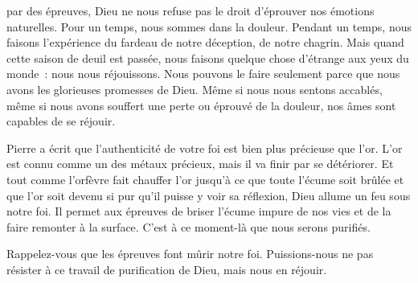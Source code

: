 
 par des épreuves, Dieu ne nous refuse pas
 le droit d'éprouver nos émotions naturelles. Pour un temps, nous sommes
 dans la douleur. Pendant un temps, nous faisons l'expérience du fardeau
 de notre déception, de notre chagrin. Mais quand cette saison de deuil
 est passée, nous faisons quelque chose d'étrange aux yeux du monde~:
 nous nous réjouissons.
 Nous pouvons le faire seulement parce que nous avons les glorieuses
 promesses de Dieu. Même si nous nous sentons accablés,
 même si nous avons souffert une perte ou éprouvé de la douleur,
 nos âmes sont capables de se réjouir.


Pierre a écrit que l'authenticité de votre foi est bien plus précieuse que l'or.
 L'or est connu comme un des métaux précieux, mais il va finir par se détériorer.
 Et tout comme l'orfèvre fait chauffer l'or jusqu'à ce que toute l'écume
 soit brûlée et que l'or soit devenu si pur qu'il puisse y voir sa réflexion,
 Dieu allume un feu sous notre foi. Il permet aux épreuves de briser l'écume
 impure de nos vies et de la faire remonter à la surface.
 C'est à ce moment-là que nous serons purifiés.

Rappelez-vous que les épreuves font mûrir notre foi.
 Puissions-nous ne pas résister à ce travail de purification de Dieu,
 mais nous en réjouir.

\dvrule






